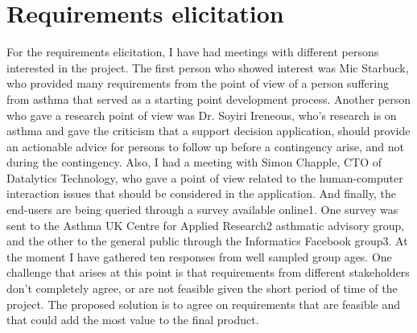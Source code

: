 \section{Requirements elicitation}
For the requirements elicitation, I have had meetings with different persons interested in the project. The first person who showed
interest was Mic Starbuck, who provided many requirements from the point of view of a person suffering from asthma that served as a starting point development process. Another person who gave a research point of view was Dr. Soyiri Ireneous, who’s research is on asthma and gave the criticism that a support decision application, should provide an actionable advice for persons to follow up before a contingency arise, and not during the contingency. Also, I had a meeting with Simon Chapple, CTO of Datalytics Technology, who gave a point of view related to the human-computer interaction issues that should be considered in the application. And finally, the end-users are being queried through a survey available online1. One survey was sent to the Asthma UK Centre for Applied Research2 asthmatic advisory group, and the other to the general public through the Informatics Facebook group3. At the moment I have gathered ten responses from well sampled group ages. One challenge that arises at this point is that requirements from different stakeholders don’t completely agree, or are not feasible given the short period of time of the project. The proposed solution is to agree on requirements that are feasible and that could add the most value to the final product.
